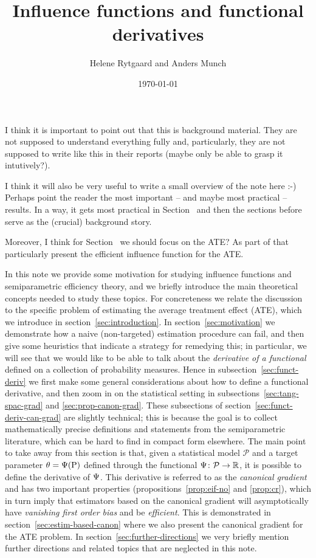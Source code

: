 \documentclass[a4,danish]{article}
\title{Influence functions and functional derivatives}
\author{Helene Rytgaard and Anders Munch}
\date{\today}
\begin{document}
\maketitle

I think it is important to point out that this is background material. They are not supposed to
understand everything fully and, particularly, they are not supposed to write like this in their
reports (maybe only be able to grasp it intutively?).

I think it will also be very useful to write a small overview of the note here :-) Perhaps point the
reader the most important -- and maybe most practical -- results. In a way, it gets most practical
in Section~\label{sec:estim-based-canon} and then the sections before serve as the (crucial)
background story.

Moreover, I think for Section~\label{sec:estim-based-canon} we should
focus on the ATE? As part of that particularly present the efficient
influence function for the ATE.

In this note we provide some motivation for studying influence functions and semiparametric
efficiency theory, and we briefly introduce the main theoretical concepts needed to study these
topics. For concreteness we relate the discussion to the specific problem of estimating the average
treatment effect (ATE), which we introduce in section~\ref{sec:introduction}. In
section~\ref{sec:motivation} we demonstrate how a naive (non-targeted) estimation procedure can
fail, and then give some heuristics that indicate a strategy for remedying this; in particular, we
will see that we would like to be able to talk about the \textit{derivative of a functional} defined
on a collection of probability measures. Hence in subsection~\ref{sec:funct-deriv} we first make
some general considerations about how to define a functional derivative, and then zoom in on the
statistical setting in subsections~\ref{sec:tang-spac-grad} and \ref{sec:prop-canon-grad}. These
subsections of section~\ref{sec:funct-deriv-can-grad} are slightly technical; this is because the
goal is to collect mathematically precise definitions and statements from the semiparametric
literature, which can be hard to find in compact form elsewhere. The main point to take away from
this section is that, given a statistical model $\mathcal{P}$ and a target parameter
$\theta = \operatorname{\Psi}(\mathrm{{P}})$ defined through the functional $\operatorname{\Psi} \colon \mathcal{P} \rightarrow \mathbb{R}$, it is
possible to define the derivative of $\operatorname{\Psi}$. This derivative is referred to as the \textit{canonical
  gradient} and has two important properties (propositions~\ref{prop:eif-no} and \ref{prop:cr}),
which in turn imply that estimators based on the canonical gradient will asymptotically have
\textit{vanishing first order bias} and be \textit{efficient}. This is demonstrated in
section~\ref{sec:estim-based-canon} where we also present the canonical gradient for the ATE
problem. In section~\ref{sec:further-directions} we very briefly mention further directions and
related topics that are neglected in this note.
\end{document}
